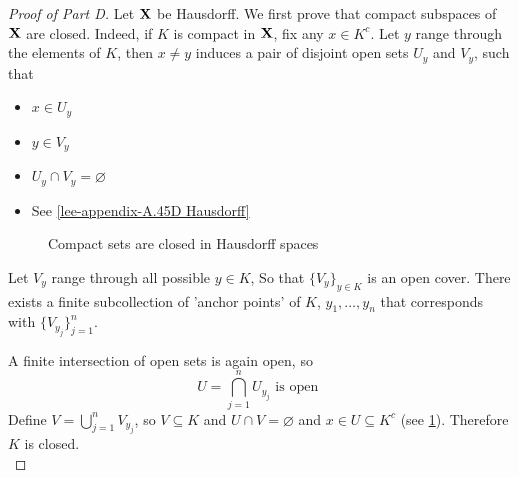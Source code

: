 \documentclass[../main-manifolds.tex]{subfiles}
\begin{document}
\begin{proof}[Proof of  Part D]
    Let ${\mathbf{X}}$ be Hausdorff. We first prove that compact subspaces of ${\mathbf{X}}$ are closed. Indeed, if $K$ is compact in ${\mathbf{X}}$, fix any $x\in K^c$. Let $y$ range through the elements of $K$, then $x\neq y$ induces a pair of disjoint open sets $U_y$ and $V_y$, such that
    
\begin{itemize}
    \item $x\in U_y$
    \item $y\in V_y$
    \item $U_y\cap V_y=\varnothing$
    \item See \cref{lee-appendix-A.45D Hausdorff}
\end{itemize}





\begin{figure}[htbp]
    \centering
    \caption{Compact sets are closed in Hausdorff spaces}
    \label{lee-appendix-A.45D-compact-open}
\end{figure}

Let $V_y$ range through all possible $y\in K$, So that $\{V_y\}_{y\in K}$ is an open cover. There exists a finite subcollection of 'anchor points' of $K$, $y_1,\ldots,y_n$ that corresponds with $\{V_{y_j}\}_{j=1}^n$.

A finite intersection of open sets is again open, so 
\[
    U = \bigcap_{j=1}^n U_{y_j}\text{ is open }
\]
Define $V = \bigcup_{j=1}^nV_{y_j}$, so $V\subseteq K$ and $U\cap V = \varnothing$ and $x\in U\subseteq K^c$ (see \cref{lee-appendix-A.45D-compact-open}). Therefore $K$ is closed.\\




\end{proof}
\end{document}
